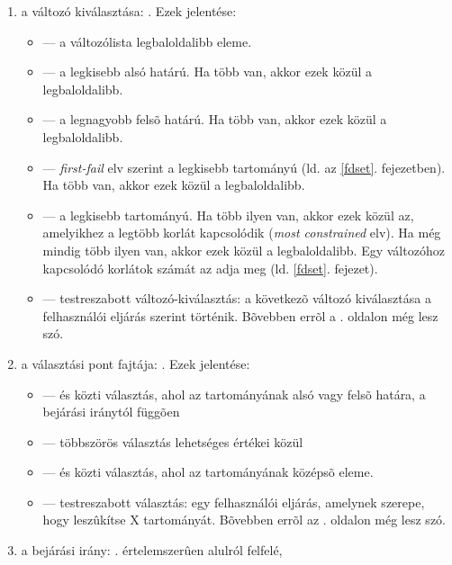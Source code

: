 \begin{enumerate}
\item a változó kiválasztása: . Ezek jelentése:
	\begin{itemize}
	\item {} --- a változólista legbaloldalibb eleme.
	\item {} --- a legkisebb alsó határú. Ha több van, akkor ezek közül
	a legbaloldalibb.
	\item {} --- a legnagyobb felsõ határú. Ha több van, akkor ezek közül
	a legbaloldalibb.
	\item {} --- \emph{first-fail} elv szerint a legkisebb tartományú
	(ld.  az \ref{fdset}. fejezetben). Ha több van, akkor ezek közül
	a legbaloldalibb.
	\item {} --- a legkisebb tartományú. Ha több ilyen van, akkor ezek
    	közül az, amelyikhez a legtöbb korlát kapcsolódik (\emph{most constrained} elv).
	Ha még mindig több ilyen van, akkor ezek közül a legbaloldalibb. Egy változóhoz
	kapcsolódó korlátok számát az  adja meg (ld. \ref{fdset}. fejezet).
	\item {} --- testreszabott változó-kiválasztás: a következõ
	változó kiválasztása a  felhasználói eljárás szerint történik. Bõvebben
	errõl a \pageref{variable:sel}. oldalon még lesz szó.
	\end{itemize}
\item a választási pont fajtája: . Ezek
jelentése:
	\begin{itemize}
	\item {} ---  és  közti választás, ahol
	 az  tartományának alsó vagy felsõ határa, a bejárási iránytól
	függõen
	\item {} --- többszörös választás  lehetséges értékei közül
	\item {} ---  és  közti választás, ahol
	 az  tartományának középsõ eleme.
	\item {} --- testreszabott választás:  egy felhasználói
	eljárás, amelynek szerepe, hogy leszûkítse X tartományát. Bõvebben errõl
	az \pageref{value:enum}. oldalon még lesz szó.
	\end{itemize}
\item a bejárási irány: .  értelemszerûen alulról felfelé,

\end{enumerate}
